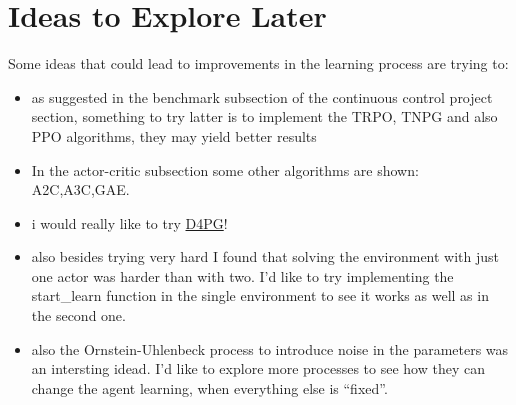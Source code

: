\documentclass[
]{article}
\begin{document}
\pagebreak

\hypertarget{ideas-to-explore-later}{%
\section{Ideas to Explore Later}\label{ideas-to-explore-later}}

Some ideas that could lead to improvements in the learning process are
trying to:

\begin{itemize}
\item
  as suggested in the benchmark subsection of the continuous control
  project section, something to try latter is to implement the TRPO,
  TNPG and also PPO algorithms, they may yield better results
\item
  In the actor-critic subsection some other algorithms are shown:
  A2C,A3C,GAE.
\item
  i would really like to try
  \href{https://openreview.net/pdf?id=SyZipzbCb}{D4PG}!
\item
  also besides trying very hard I found that solving the environment
  with just one actor was harder than with two. I'd like to try
  implementing the start\_learn function in the single environment to
  see it works as well as in the second one.
\item
  also the Ornstein-Uhlenbeck process to introduce noise in the
  parameters was an intersting idead. I'd like to explore more processes
  to see how they can change the agent learning, when everything else is
  ``fixed''.
\end{itemize}
\end{document}
